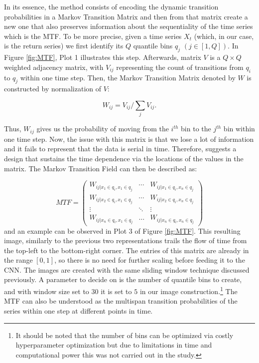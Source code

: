 \documentclass[11pt, a4paper]{article}
\begin{document}
In its essence, the method consists of encoding the dynamic transition probabilities in a Markov Transition Matrix and then from that matrix create a new one that also preserves information about the sequentiality of the time series which is the MTF.
To be more precise, given a time series $X_t$ (which, in our case, is the return series) we first identify its $Q$ quantile bins $q_j$ $(j \in [1,Q])$. In Figure \ref{fig:MTF}, Plot 1 illustrates this step. Afterwards, matrix $V$ is a $Q \times Q$ weighted adjacency matrix, with $V_{ij}$ representing the count of transitions from $q_i$ to $q_j$ within one time step. 
Then, the Markov Transition Matrix denoted by $W$ is constructed by normalization of $V$:

\begin{equation}
\label{eq:W}
    W_{ij} = V_{ij}/\sum_j V_{ij}.
\end{equation}

Thus, $W_{ij}$ gives us the probability of moving from the $i^{th}$ bin to the $j^{th}$ bin within one time step. Now, the issue with this matrix is that we lose a lot of information and it fails to represent that the data is serial in time. Therefore, \cite{wang2015encoding} suggests a design that sustains the time dependence via the locations of the values in the matrix. The Markov Transition Field can then be described as:

\begin{equation}
    \label{eq:MTF}
        MTF =\begin{pmatrix} 
    W_{ij|x_1 \in q_i, x_1 \in q_j} & \cdots & W_{ij|x_1 \in q_i, x_n \in q_j}\\
    W_{ij|x_2 \in q_i, x_1 \in q_j} & \cdots & W_{ij|x_2 \in q_i, x_n \in q_j}\\
    \vdots & \ddots & \vdots\\
    W_{ij|x_n \in q_i, x_1 \in q_j} & \dots & W_{ij|x_n \in q_i, x_n \in q_j}
    \end{pmatrix}
\end{equation}
and an example can be observed in Plot 3 of Figure \ref{fig:MTF}. This resulting image, similarly to the previous two representations trails the flow of time from the top-left to the bottom-right corner.
The entries of this matrix are already in the range $[0,1]$, so there is no need for further scaling before feeding it to the CNN. The images are created with the same sliding window technique discussed previously. A parameter to decide on is the number of quantile bins to create, and with window size set to $30$ it is set to $5$ in our image construction.\footnote{It should be noted that the number of bins can be optimized via costly hyperparameter optimization but due to limitations in time and computational power this was not carried out in the study.}
The MTF can also be understood as the multispan transition probabilities of the series within one step at different points in time.
\end{document}
